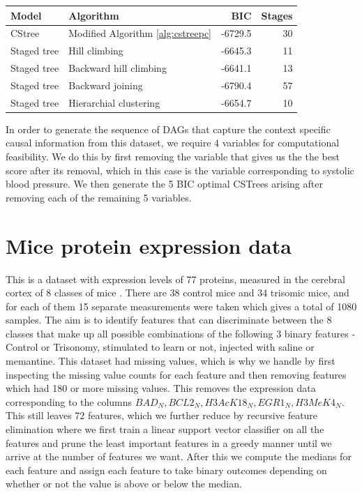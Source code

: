 \documentclass{tufte-book}
\begin{document}
\begin{Definition}
\begin{center}
\begin{tabular}{l|l|r|r}
\hline
Model & Algorithm & BIC & Stages\\
\hline
CStree & Modified Algorithm \ref{alg:cstreepc} & -6729.5 & 30\\
Staged tree & Hill climbing & -6645.3 & 11\\
Staged tree & Backward hill climbing & -6641.1 & 13\\
Staged tree & Backward joining & -6790.4 & 57\\
Staged tree & Hierarchial clustering & -6654.7 & 10\\
\end{tabular}
\end{center}



In order to generate the sequence of DAGs that capture the context specific causal information from this dataset, we require 4 variables for computational feasibility. We do this by first removing the variable that gives us the the best score after its removal, which in this case is the variable corresponding to systolic blood pressure. We then generate the 5 BIC optimal CSTrees arising after removing each of the remaining 5 variables.





 \newpage 

\section{Mice protein expression data}
\label{sec:orgae88564}
This is a dataset with expression levels of 77 proteins, measured in the cerebral cortex of 8 classes of mice \cite{higuera-2015-self-organ}. There are 38 control mice and 34 trisomic mice, and for each of them 15 separate measurements were taken which gives a total of 1080 samples. The aim is to identify features that can discriminate between the 8 classes that make up all possible combinations of the following 3 binary features - Control or Trisonomy, stimulated to learn or not, injected with saline or memantine. This dataset had missing values, which is why we handle by first inspecting the missing value counts for each feature and then removing features which had 180 or more missing values. This removes the expression data corresponding to the columns \(BAD_N, BCL2_N, H3AcK18_N, EGR1_N, H3MeK4_N\). This still leaves 72 features, which we further reduce by recursive feature elimination \cite{guyon-2002} where we first train a linear support vector classifier on all the features and prune the least important features in a greedy manner until we arrive at the number of features we want. After this we compute the medians for each feature and assign each feature to take binary outcomes depending on whether or not the value is above or below the median.




\end{Definition}
\end{document}
